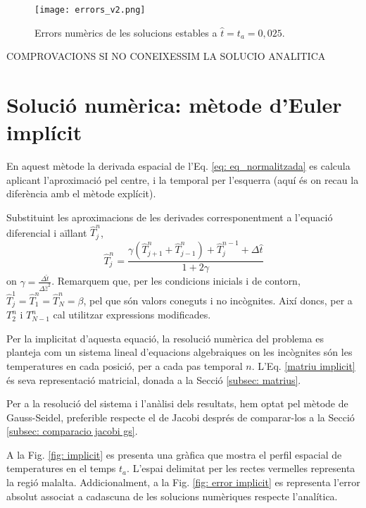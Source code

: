 \documentclass[11pt]{article}
\begin{document}
\begin{figure}[hbt!]
    \centering
    \texttt{[image: errors\_v2.png]}  
    \caption{Errors numèrics de les solucions estables a $\hat{t}=t_a=0,025$.}
    \label{fig: error_explicit}
\end{figure}

COMPROVACIONS SI NO CONEIXESSIM LA SOLUCIO ANALITICA

\section{Solució numèrica: mètode d'Euler implícit}
En aquest mètode la derivada espacial de l'Eq. \eqref{eq: eq_normalitzada} es calcula aplicant l'aproximació pel centre, i la temporal per l'esquerra (aquí és on recau la diferència amb el mètode explícit).

Substituint les aproximacions de les derivades corresponentment a l'equació diferencial i aïllant $\hat{T}_j^n$,
\begin{equation}
    \hat{T}_j^n = \frac{\gamma \left( \hat{T}_{j+1}^n + \hat{T}_{j-1}^n \right) + \hat{T}_j^{n-1} + \Delta \hat{t}}{1 + 2\gamma}
    \label{Tnj implici}
\end{equation}
on $\gamma =\frac{\Delta \hat{t}}{\Delta \hat{z}^2}$. Remarquem que, per les condicions inicials i de contorn, $\hat{T}_j^1=\hat{T}_1^n=\hat{T}_N^n = \beta$, pel que són valors coneguts i no incògnites. Així doncs, per a $T^n_{2}$ i $T^n_{N-1}$ cal utilitzar expressions modificades.

Per la implicitat d'aquesta equació, la resolució numèrica del problema es planteja com un sistema lineal d'equacions algebraiques on les incògnites són les temperatures en cada posició, per a cada pas temporal $n$. L'Eq. \eqref{matriu implicit} és seva representació matricial, donada a la Secció \ref{subsec: matrius}.

Per a la resolució del sistema i l'anàlisi dels resultats, hem optat pel mètode de Gauss-Seidel, preferible respecte el de Jacobi després de comparar-los a la Secció \ref{subsec: comparacio jacobi gs}.

A la Fig. \ref{fig: implicit} es presenta una gràfica que mostra el perfil espacial de temperatures en el temps $t_a$. L'espai delimitat per les rectes vermelles representa la regió malalta. Addicionalment, a la Fig. \ref{fig: error implicit} es representa l'error absolut associat a cadascuna de les solucions numèriques respecte l'analítica. 
\end{document}
